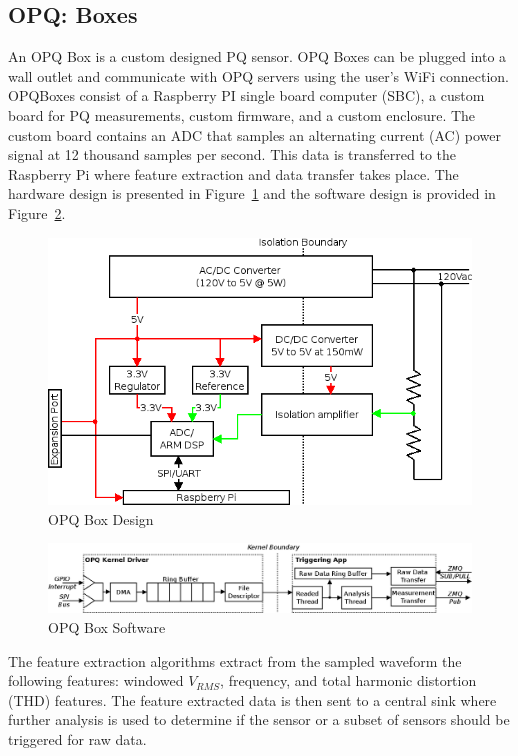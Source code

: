 \subsection{OPQ: Boxes}\label{subsec:opq:-boxes}
An OPQ Box is a custom designed PQ sensor. OPQ Boxes can be plugged into a wall outlet and communicate with OPQ servers using the user's WiFi connection. OPQBoxes consist of a Raspberry PI single board computer (SBC), a custom board for PQ measurements, custom firmware, and a custom enclosure. The custom board contains an ADC that samples an alternating current (AC) power signal at 12 thousand samples per second. This data is transferred to the Raspberry Pi where feature extraction and data transfer takes place. The hardware design is presented in Figure~\ref{fig:opq-box-design} and the software design is provided in Figure~\ref{fig:opq-box-software}.

\begin{figure}
	\centering
	\includegraphics[width=.75\linewidth]{figures/opqbox_diagram.png}
	\caption{OPQ Box Design}\label{fig:opq-box-design}
\end{figure}

\begin{figure}
	\centering
	\includegraphics[width=.75\linewidth]{figures/opqbox_software.png}
	\caption{OPQ Box Software}\label{fig:opq-box-software}
\end{figure}

The feature extraction algorithms extract from the sampled waveform the following features: windowed $V_{RMS}$, frequency, and total harmonic distortion (THD) features. The feature extracted data is then sent to a central sink where further analysis is used to determine if the sensor or a subset of sensors should be triggered for raw data.

